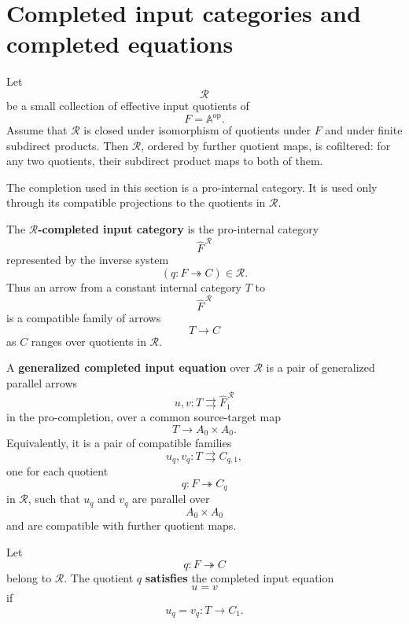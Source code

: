 \section{Completed input categories and completed equations}
\label{sec:reiterman-completed-input-categories-equations}

Let
\[
\mathcal R
\]
be a small collection of effective input quotients of
\[
F=\mathbb A^{\mathrm{op}}.
\]
Assume that \(\mathcal R\) is closed under isomorphism of quotients under
\(F\) and under finite subdirect products. Then \(\mathcal R\), ordered by
further quotient maps, is cofiltered: for any two quotients, their subdirect
product maps to both of them.

The completion used in this section is a pro-internal category. It is used
only through its compatible projections to the quotients in \(\mathcal R\).

\begin{definition}
\label{def:reiterman-completed-input-category}
The \textbf{\(\mathcal R\)-completed input category} is the pro-internal
category
\[
\widehat F^{\,\mathcal R}
\]
represented by the inverse system
\[
(q:F\twoheadrightarrow C)\in\mathcal R.
\]
Thus an arrow from a constant internal category \(T\) to
\[
\widehat F^{\,\mathcal R}
\]
is a compatible family of arrows
\[
T\to C
\]
as \(C\) ranges over quotients in \(\mathcal R\).
\end{definition}

\begin{definition}
\label{def:reiterman-completed-input-equation}
A \textbf{generalized completed input equation} over \(\mathcal R\) is a pair
of generalized parallel arrows
\[
u,v:T\rightrightarrows \widehat F^{\,\mathcal R}_1
\]
in the pro-completion, over a common source-target map
\[
T\to A_0\times A_0.
\]
Equivalently, it is a pair of compatible families
\[
u_q,v_q:T\rightrightarrows C_{q,1},
\]
one for each quotient
\[
q:F\twoheadrightarrow C_q
\]
in \(\mathcal R\), such that \(u_q\) and \(v_q\) are parallel over
\[
A_0\times A_0
\]
and are compatible with further quotient maps.
\end{definition}

\begin{definition}
\label{def:reiterman-satisfaction-completed-equation}
Let
\[
q:F\twoheadrightarrow C
\]
belong to \(\mathcal R\). The quotient \(q\) \textbf{satisfies} the completed
input equation
\[
u=v
\]
if
\[
u_q=v_q:T\to C_1.
\]
\end{definition}

